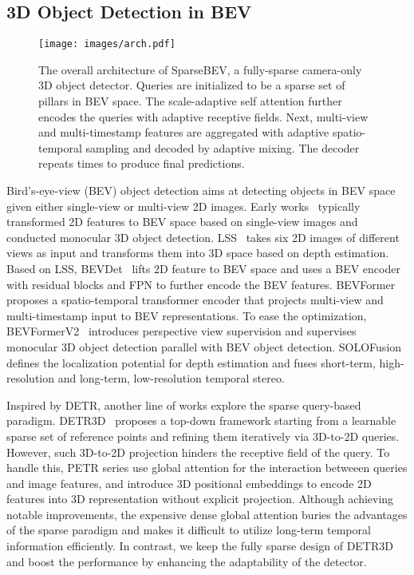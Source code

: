 \documentclass[10pt,twocolumn,letterpaper]{article}
\begin{document}
\subsection{3D Object Detection in BEV}

\begin{figure*} 
  \centering
  \texttt{[image: images/arch.pdf]}
  \vspace{-12pt}
  \caption{The overall architecture of SparseBEV, a fully-sparse camera-only 3D object detector. Queries are initialized to be a sparse set of pillars in BEV space. The scale-adaptive self attention further encodes the queries with adaptive receptive fields. Next, multi-view and multi-timestamp features are aggregated with adaptive spatio-temporal sampling and decoded by adaptive mixing. The decoder repeats  times to produce final predictions.}
  \vspace{-5pt}
  \label{fig:arch}
\end{figure*}

Bird's-eye-view (BEV) object detection \cite{vpn, lss, bevdet, detr3d, petr, simmod, bevformer, bevformerv2, solofusion} aims at detecting objects in BEV space given either single-view or multi-view 2D images.
Early works~\cite{oft, pseudo-lidar, caddn} typically transformed 2D features to BEV space based on single-view images and conducted monocular 3D object detection.
LSS~\cite{lss} takes six 2D images of different views as input and transforms them into 3D space based on depth estimation.
Based on LSS, BEVDet~\cite{bevdet} lifts 2D feature to BEV space and uses a BEV encoder with residual blocks and FPN to further encode the BEV features.
BEVFormer~\cite{bevformer} proposes a spatio-temporal transformer encoder that projects multi-view and multi-timestamp input to BEV representations.
To ease the optimization, BEVFormerV2~\cite{bevformerv2} introduces perspective view supervision and supervises monocular 3D object detection parallel with BEV object detection.
SOLOFusion~\cite{solofusion} defines the localization potential for depth estimation and fuses short-term, high-resolution and long-term, low-resolution temporal stereo.

Inspired by DETR, another line of works \cite{detr3d, petr, petrv2} explore the sparse query-based paradigm.
DETR3D~\cite{detr3d} proposes a top-down framework starting from a learnable sparse set of reference points and refining them iteratively via 3D-to-2D queries.
However, such 3D-to-2D projection hinders the receptive field of the query.
To handle this, PETR series \cite{petr, petrv2} use global attention for the interaction betweeen queries and image features, and introduce 3D positional embeddings to encode 2D features into 3D representation without explicit projection.
Although achieving notable improvements, the expensive dense global attention buries the advantages of the sparse paradigm and makes it difficult to utilize long-term temporal information efficiently.
In contrast, we keep the fully sparse design of DETR3D and boost the performance by enhancing the adaptability of the detector.
\end{document}
